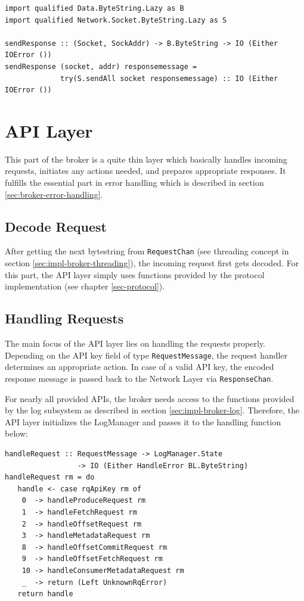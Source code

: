 \begin{lstlisting}[caption={Send data via socket}]
import qualified Data.ByteString.Lazy as B
import qualified Network.Socket.ByteString.Lazy as S

sendResponse :: (Socket, SockAddr) -> B.ByteString -> IO (Either IOError ())
sendResponse (socket, addr) responsemessage = 
             try(S.sendAll socket responsemessage) :: IO (Either IOError ())
\end{lstlisting}

\newpage
\section{API Layer}
\label{sec:broker-api}
This part of the broker is a quite thin layer which basically handles incoming
requests, initiates any actions needed, and prepares appropriate responses. It fulfills the
essential part in error handling which is described in section 
\ref{sec:broker-error-handling}. 

\subsection{Decode Request}
\label{sec:impl-broker-api-handle}
After getting the next bytestring from \lstinline{RequestChan} (see threading
concept in section \ref{sec:impl-broker-threading}), the incoming request first
gets decoded. For this part, the API layer simply uses functions provided by the
protocol implementation (see chapter \ref{sec-protocol}).

\subsection{Handling Requests}
The main focus of the API layer lies on handling the
requests properly. Depending on the API key field of type
\lstinline{RequestMessage}, the
request handler determines an appropriate action. In case of a valid API key,
the encoded response message is passed back to the Network Layer via
\lstinline{ResponseChan}.

For nearly all provided APIs, the broker needs access to the functions provided
by the log subsystem as described in section \ref{sec:impl-broker-log}. Therefore, the
API layer initializes the LogManager and passes it to the handling function
below:
\begin{lstlisting}[caption={Handling requests depending on ApiKey}]
handleRequest :: RequestMessage -> LogManager.State 
                 -> IO (Either HandleError BL.ByteString)
handleRequest rm = do
   handle <- case rqApiKey rm of
    0  -> handleProduceRequest rm
    1  -> handleFetchRequest rm
    2  -> handleOffsetRequest rm
    3  -> handleMetadataRequest rm
    8  -> handleOffsetCommitRequest rm
    9  -> handleOffsetFetchRequest rm
    10 -> handleConsumerMetadataRequest rm
    _  -> return (Left UnknownRqError)
   return handle
\end{lstlisting}

